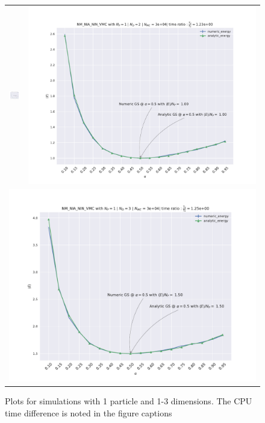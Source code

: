 \begin{figure}
\hspace{-2.8cm}
\begin{tabular}{cc}
\includegraphics[width = 0.5\paperwidth, height = 10mm]{figures/NM_NIA_NIN_np_1_nd_1.pdf} & \includegraphics[width = 0.5\paperwidth]{figures/NM_NIA_NIN_np_1_nd_2.pdf} \\
\multicolumn{2}{c}{\includegraphics[width=0.5\paperwidth]{figures/NM_NIA_NIN_np_1_nd_3.pdf} }
\end{tabular}
\caption{Plots for simulations with 1 particle and 1-3 dimensions. The CPU time difference is noted in the figure captions}
\label{fig:1b_1}
\end{figure}

